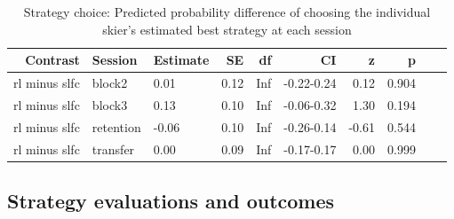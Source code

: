 \documentclass[pdflatex,sn-mathphys-num]{sn-jnl}%
\theoremstyle{thmstyleone}%
\theoremstyle{thmstyletwo}%
\theoremstyle{thmstylethree}%
\begin{document}
\begin{appendices}
\begin{table}[h!]
\caption{Strategy choice: Predicted probability difference of choosing the individual skier's estimated best strategy at each session}\label{table_strategychoice_estimatedbest_groupdiff}
\centering
\begin{tabular}{rllrrrrrrl}
  \hline
 Contrast & Session & Estimate & SE & df & CI & z & p \\ 
  \hline
 rl minus slfc & block2 & 0.01 & 0.12 & Inf & -0.22-0.24 & 0.12 &    0.904 \\ 
   rl minus slfc & block3 & 0.13 & 0.10 & Inf & -0.06-0.32 & 1.30 &    0.194 \\ 
   rl minus slfc & retention & -0.06 & 0.10 & Inf & -0.26-0.14 & -0.61 &    0.544 \\ 
  rl minus slfc & transfer & 0.00 & 0.09 & Inf & -0.17-0.17 & 0.00 &    0.999 \\ 
   \hline
\end{tabular}
\end{table}


\subsection{Strategy evaluations and outcomes}


\end{appendices}
\end{document}
